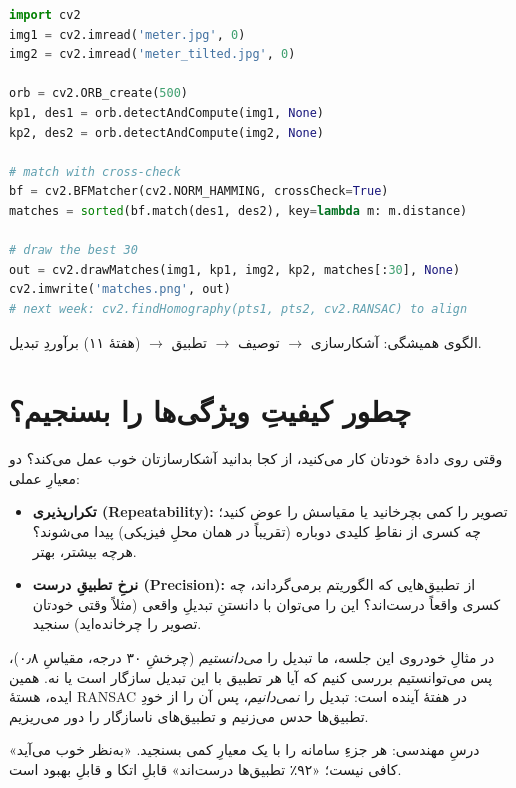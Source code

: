 \documentclass[12pt]{article}
\begin{document}
\begin{ltrcode}
\begin{lstlisting}[language=Python]
import cv2
img1 = cv2.imread('meter.jpg', 0)
img2 = cv2.imread('meter_tilted.jpg', 0)

orb = cv2.ORB_create(500)
kp1, des1 = orb.detectAndCompute(img1, None)
kp2, des2 = orb.detectAndCompute(img2, None)

# match with cross-check
bf = cv2.BFMatcher(cv2.NORM_HAMMING, crossCheck=True)
matches = sorted(bf.match(des1, des2), key=lambda m: m.distance)

# draw the best 30
out = cv2.drawMatches(img1, kp1, img2, kp2, matches[:30], None)
cv2.imwrite('matches.png', out)
# next week: cv2.findHomography(pts1, pts2, cv2.RANSAC) to align
\end{lstlisting}
\end{ltrcode}

الگوی همیشگی: آشکارسازی $\rightarrow$ توصیف $\rightarrow$ تطبیق $\rightarrow$ (هفتهٔ ۱۱) برآوردِ تبدیل.

\section{چطور کیفیتِ ویژگی‌ها را بسنجیم؟}

وقتی روی دادهٔ خودتان کار می‌کنید، از کجا بدانید آشکارسازتان خوب عمل می‌کند؟ دو معیارِ عملی:

\begin{itemize}
  \item \textbf{تکرارپذیری (Repeatability):} تصویر را کمی بچرخانید یا مقیاسش را عوض کنید؛ چه کسری از نقاطِ کلیدی دوباره (تقریباً در همان محلِ فیزیکی) پیدا می‌شوند؟ هرچه بیشتر، بهتر.
  \item \textbf{نرخِ تطبیقِ درست (Precision):} از تطبیق‌هایی که الگوریتم برمی‌گرداند، چه کسری واقعاً درست‌اند؟ این را می‌توان با دانستنِ تبدیلِ واقعی (مثلاً وقتی خودتان تصویر را چرخانده‌اید) سنجید.
\end{itemize}

\begin{riyazi}
در مثالِ خودروی این جلسه، ما تبدیل را \emph{می‌دانستیم} (چرخشِ ۳۰ درجه، مقیاسِ ۰٫۸)، پس می‌توانستیم بررسی کنیم که آیا هر تطبیق با این تبدیل سازگار است یا نه. همین ایده، هستهٔ RANSAC در هفتهٔ آینده است: تبدیل را \emph{نمی‌دانیم}، پس آن را از خودِ تطبیق‌ها حدس می‌زنیم و تطبیق‌های ناسازگار را دور می‌ریزیم.
\end{riyazi}

\begin{yaddasht}
درسِ مهندسی: هر جزءِ سامانه را با یک معیارِ کمی بسنجید. «به‌نظر خوب می‌آید» کافی نیست؛ «۹۲٪ تطبیق‌ها درست‌اند» قابلِ اتکا و قابلِ بهبود است.
\end{yaddasht}
\end{document}
